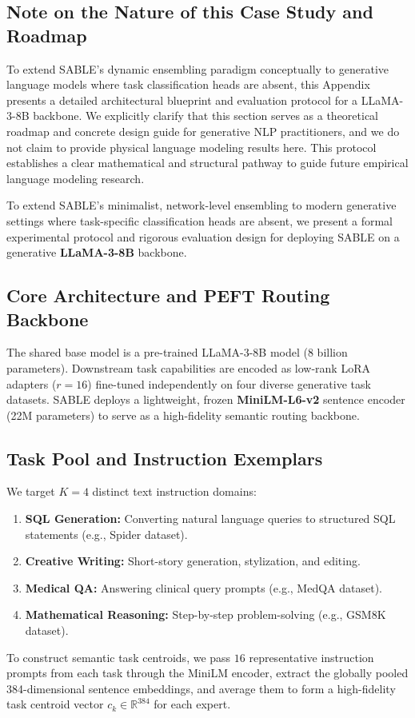 \documentclass{article}
\theoremstyle{plain}
\theoremstyle{definition}
\theoremstyle{remark}
\begin{document}
\subsection*{Note on the Nature of this Case Study and Roadmap}
To extend SABLE's dynamic ensembling paradigm conceptually to generative language models where task classification heads are absent, this Appendix presents a detailed architectural blueprint and evaluation protocol for a LLaMA-3-8B backbone. We explicitly clarify that this section serves as a theoretical roadmap and concrete design guide for generative NLP practitioners, and we do not claim to provide physical language modeling results here. This protocol establishes a clear mathematical and structural pathway to guide future empirical language modeling research.

To extend SABLE's minimalist, network-level ensembling to modern generative settings where task-specific classification heads are absent, we present a formal experimental protocol and rigorous evaluation design for deploying SABLE on a generative \textbf{LLaMA-3-8B} backbone.

\subsection{Core Architecture and PEFT Routing Backbone}
The shared base model is a pre-trained LLaMA-3-8B model (8 billion parameters). Downstream task capabilities are encoded as low-rank LoRA adapters ($r=16$) fine-tuned independently on four diverse generative task datasets. SABLE deploys a lightweight, frozen \textbf{MiniLM-L6-v2} sentence encoder (22M parameters) to serve as a high-fidelity semantic routing backbone.

\subsection{Task Pool and Instruction Exemplars}
We target $K=4$ distinct text instruction domains:
\begin{enumerate}
    \item \textbf{SQL Generation:} Converting natural language queries to structured SQL statements (e.g., Spider dataset).
    \item \textbf{Creative Writing:} Short-story generation, stylization, and editing.
    \item \textbf{Medical QA:} Answering clinical query prompts (e.g., MedQA dataset).
    \item \textbf{Mathematical Reasoning:} Step-by-step problem-solving (e.g., GSM8K dataset).
\end{enumerate}
To construct semantic task centroids, we pass $16$ representative instruction prompts from each task through the MiniLM encoder, extract the globally pooled 384-dimensional sentence embeddings, and average them to form a high-fidelity task centroid vector $c_k \in \mathbb{R}^{384}$ for each expert.
\end{document}
